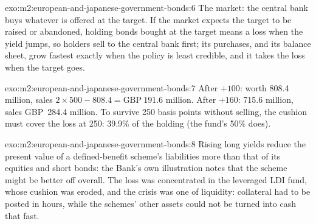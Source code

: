 \begin{solution}{exo:m2:european-and-japanese-government-bonds:6}
The market: the central bank buys whatever is offered at the target. If the
market expects the target to be raised or abandoned, holding bonds bought at
the target means a loss when the yield jumps, so holders sell to the central
bank first; its purchases, and its balance sheet, grow fastest exactly when
the policy is least credible, and it takes the loss when the target goes.
\end{solution}

\begin{solution}{exo:m2:european-and-japanese-government-bonds:7}
After $+100$:  worth 808.4 million, sales $2 \times 500 - 808.4 =
\text{GBP}~191.6$ million. After $+160$:  715.6 million, sales GBP~284.4
million. To survive 250 basis points without selling, the cushion must cover
the loss at 250: 39.9\% of the holding (the fund's 50\% does).
\end{solution}

\begin{solution}{exo:m2:european-and-japanese-government-bonds:8}
Rising long yields reduce the present value of a defined-benefit scheme's
liabilities more than that of its equities and short bonds: the Bank's own
illustration notes that the scheme might be better off overall. The loss was
concentrated in the leveraged LDI fund, whose cushion was eroded, and the
crisis was one of liquidity: collateral had to be posted in hours, while the
schemes' other assets could not be turned into cash that fast.
\end{solution}

